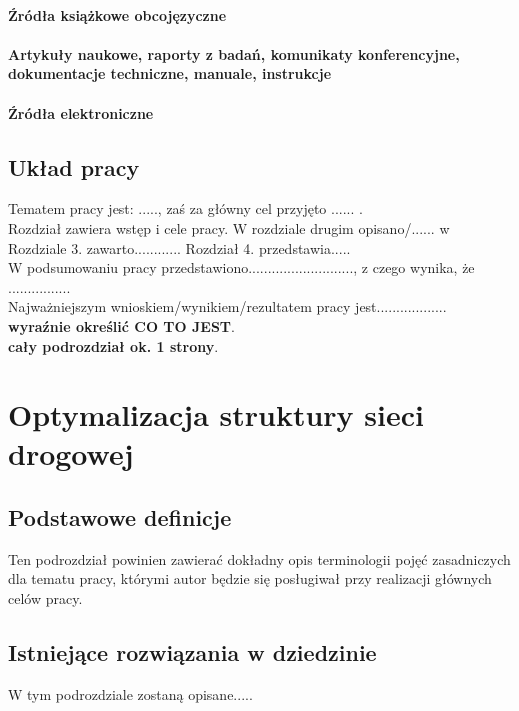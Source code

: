 \documentclass[twoside,12pt]{report}
\begin{document}
\subsubsection{Źródła książkowe obcojęzyczne}
\subsubsection{Artykuły naukowe, raporty z badań, komunikaty konferencyjne,
dokumentacje techniczne, manuale, instrukcje}
\subsubsection{Źródła elektroniczne}


\section{Układ pracy}
Tematem pracy jest: ....., zaś za główny cel przyjęto ...... . \\
Rozdział \label{rozdz.wstep} zawiera wstęp i cele pracy. W rozdziale drugim
opisano/...... w Rozdziale 3. zawarto............ Rozdział 4. przedstawia..... \\
W podsumowaniu pracy przedstawiono..........................., z czego wynika,
że ................  \\
Najważniejszym wnioskiem/wynikiem/rezultatem pracy jest..................\\ {\bf wyraźnie określić
CO TO JEST}. \\

{\bf cały podrozdział ok. 1 strony}.




\chapter{Optymalizacja struktury sieci drogowej} \label{etykietarozdzialu2}
\section{Podstawowe definicje}
Ten podrozdział powinien zawierać dokładny opis terminologii  pojęć zasadniczych dla tematu pracy, którymi autor będzie się posługiwał przy realizacji głównych celów pracy. 


\section{Istniejące rozwiązania w dziedzinie}
W tym podrozdziale zostaną opisane.....
\end{document}
